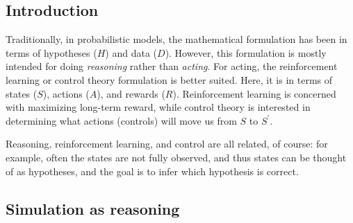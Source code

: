 \documentclass[12pt]{article}
\begin{document}

\subsection*{Introduction}

Traditionally, in probabilistic models, the mathematical formulation has been in terms of hypotheses ($H$) and data ($D$). However, this formulation is mostly intended for doing \textit{reasoning} rather than \textit{acting}. For acting, the reinforcement learning or control theory formulation is better suited. Here, it is in terms of states ($S$), actions ($A$), and rewards ($R$). Reinforcement learning is concerned with maximizing long-term reward, while control theory is interested in determining what actions (controls) will move us from $S$ to $S^\prime$.

Reasoning, reinforcement learning, and control are all related, of course: for example, often the states are not fully observed, and thus states can be thought of as hypotheses, and the goal is to infer which hypothesis is correct.

\subsection*{Simulation as reasoning}
\end{document}
